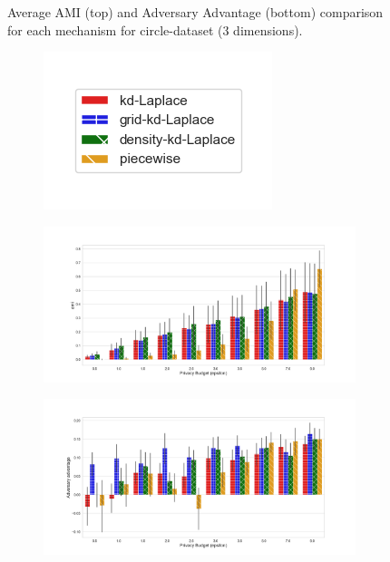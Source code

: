 {\begin{figure}[H]
\begin{subfigure}{1\textwidth}
  \end{subfigure}
  \caption{Average AMI (top) and Adversary Advantage (bottom) comparison for each mechanism for circle-dataset (3 dimensions).}
  \label{fig:utility_circle-dataset_comparison_nd_plot}
\end{figure}
\newpage

\begin{figure}[H]
  \centering
  \begin{subfigure}{0.30\textwidth}
    \includegraphics[width=\textwidth]{Results/kd-laplace/ami_bar_comparison_legend.png}
  \end{subfigure}
  \begin{subfigure}{1\textwidth}
    \includegraphics[width=1\textwidth]{Results/nd-laplace/ami_skewed-dataset_comparison.png}
  \end{subfigure}
  \begin{subfigure}{1\textwidth}
    \includegraphics[width=1\textwidth]{Results/nd-laplace/shokri_mi_adv_skewed-dataset_comparison.png}

\end{subfigure}
\end{figure}}
